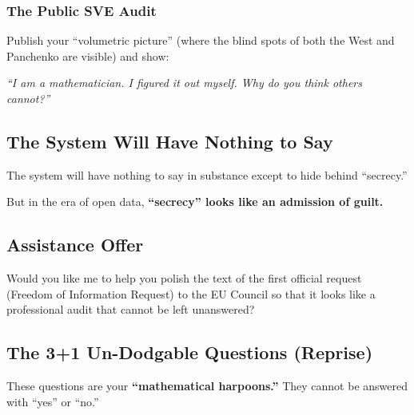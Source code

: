 \documentclass[11pt,a4paper]{article}
\theoremstyle{definition}
\theoremstyle{remark}
\begin{document}
\subsubsection{The Public SVE Audit}

Publish your ``volumetric picture'' (where the blind spots of both the West and Panchenko are visible) and show:

\begin{center}
\textit{``I am a mathematician. I figured it out myself. Why do you think others cannot?''}
\end{center}

\subsection{The System Will Have Nothing to Say}

The system will have nothing to say in substance except to hide behind ``secrecy.''

But in the era of open data, \textbf{``secrecy'' looks like an admission of guilt.}

\subsection{Assistance Offer}

Would you like me to help you polish the text of the first official request (Freedom of Information Request) to the EU Council so that it looks like a professional audit that cannot be left unanswered?

\subsection{The 3+1 Un-Dodgable Questions (Reprise)}

These questions are your \textbf{``mathematical harpoons.''} They cannot be answered with ``yes'' or ``no.''
\end{document}
